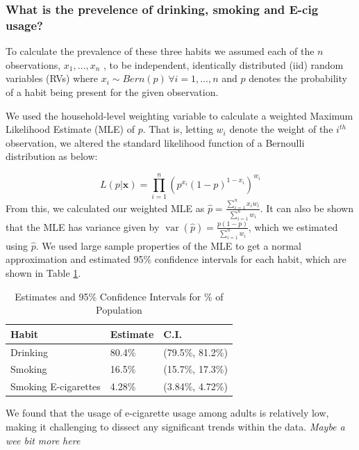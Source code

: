 \documentclass[
  11pt,
  twocolumn]{article}
\begin{document}
\hypertarget{what-is-the-prevelence-of-drinking-smoking-and-e-cig-usage}{%
\subsubsection{What is the prevelence of drinking, smoking and E-cig
usage?}\label{what-is-the-prevelence-of-drinking-smoking-and-e-cig-usage}}

To calculate the prevalence of these three habits we assumed each of the
\(n\) observations, \(x_1,…,x_n\) , to be independent, identically
distributed (iid) random variables (RVs) where
\(x_i \sim Bern(p)\, \forall i=1,…,n\) and \(p\) denotes the probability
of a habit being present for the given observation.

We used the household-level weighting variable to calculate a weighted
Maximum Likelihood Estimate (MLE) of \(p\). That is, letting \(w_i\)
denote the weight of the \(i^{th}\) observation, we altered the standard
likelihood function of a Bernoulli distribution as below:

\[L(p|\textbf{x}) = \prod_{i = 1}^{n} (p^{x_i}(1-p)^{1-x_i})^{w_i}\]
From this, we calculated our weighted MLE as
\(\widehat{p} = \frac{\sum_{i=1}^{n} x_iw_i}{\sum_{i=1}^{n} w_i}\). It
can also be shown that the MLE has variance given by
\(\mathop{\mathrm{var}}(\widehat{p})=\frac{p(1-p)}{\sum_{i=1}^{n}w_i}\),
which we estimated using \(\widehat{p}\). We used large sample
properties of the MLE to get a normal approximation and estimated 95\%
confidence intervals for each habit, which are shown in Table
\ref{tab:output-estimates-table}.

\begin{table}

\caption{\label{tab:outputestimatestable}Estimates and 95\% Confidence Intervals for \% of Population\label{tab:output-estimates-table}}
\centering
\fontsize{9}{11}\selectfont
\begin{tabular}[t]{l|l|l}
\hline
\textbf{Habit} & \textbf{Estimate} & \textbf{C.I.}\\
\hline
Drinking & 80.4\% & (79.5\%, 81.2\%)\\
\hline
Smoking & 16.5\% & (15.7\%, 17.3\%)\\
\hline
Smoking E-cigarettes & 4.28\% & (3.84\%, 4.72\%)\\
\hline
\end{tabular}
\end{table}

We found that the usage of e-cigarette usage among adults is relatively
low, making it challenging to dissect any significant trends within the
data. \emph{Maybe a wee bit more here}
\end{document}
